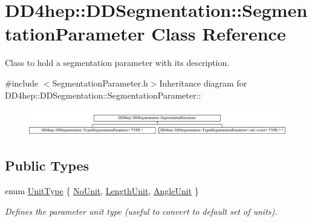\hypertarget{class_d_d4hep_1_1_d_d_segmentation_1_1_segmentation_parameter}{
\section{DD4hep::DDSegmentation::SegmentationParameter Class Reference}
\label{class_d_d4hep_1_1_d_d_segmentation_1_1_segmentation_parameter}
}


Class to hold a segmentation parameter with its description.  


{\ttfamily \#include $<$SegmentationParameter.h$>$}Inheritance diagram for DD4hep::DDSegmentation::SegmentationParameter::\begin{figure}[H]
\begin{center}
\leavevmode
\includegraphics[height=1.174cm]{class_d_d4hep_1_1_d_d_segmentation_1_1_segmentation_parameter}
\end{center}
\end{figure}
\subsection*{Public Types}
\begin{DoxyCompactItemize}
\item 
enum \hyperlink{class_d_d4hep_1_1_d_d_segmentation_1_1_segmentation_parameter_a36f5f8b8d812b2a2b81363377565d8d4}{UnitType} \{ \hyperlink{class_d_d4hep_1_1_d_d_segmentation_1_1_segmentation_parameter_a36f5f8b8d812b2a2b81363377565d8d4ab217a538e0ac077135786260a2221c14}{NoUnit}, 
\hyperlink{class_d_d4hep_1_1_d_d_segmentation_1_1_segmentation_parameter_a36f5f8b8d812b2a2b81363377565d8d4abc6abab85badff20f421ca8a5abd5554}{LengthUnit}, 
\hyperlink{class_d_d4hep_1_1_d_d_segmentation_1_1_segmentation_parameter_a36f5f8b8d812b2a2b81363377565d8d4ae1d90430aa09c467095657e0ba8b8d0f}{AngleUnit}
 \}
\begin{DoxyCompactList}\small\item\em Defines the parameter unit type (useful to convert to default set of units). \item\end{DoxyCompactList}\end{DoxyCompactItemize}
